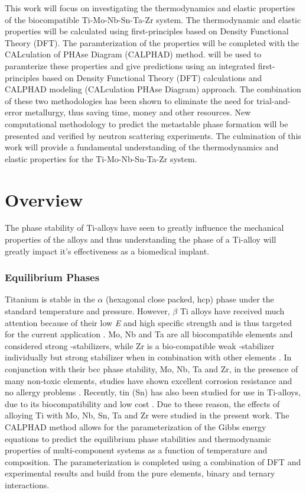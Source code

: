 This work will focus on investigating the thermodynamics and elastic properties of the biocompatible Ti-Mo-Nb-Sn-Ta-Zr system. The thermodynamic and elastic properties will be calculated using first-principles based on Density Functional Theory (DFT). The paramterization of the properties will be completed with the CALculation of PHAse Diagram (CALPHAD) method.  will be used to paramterize these properties and give predictions  using an integrated first-principles based on Density Functional Theory (DFT) calculations and CALPHAD modeling (CALculation PHAse Diagram) approach. The combination of these two methodologies has been shown to eliminate the need for trial-and-error metallurgy, thus saving time, money and other resources. New computational methodology to predict the metastable phase formation will be presented and verified by neutron scattering experiments. The culmination of this work will provide a fundamental understanding of the thermodynamics and elastic properties for the Ti-Mo-Nb-Sn-Ta-Zr system. 


\section{Overview}

The phase stability of Ti-alloys have seen to greatly influence the mechanical properties of the alloys and thus understanding the phase of a Ti-alloy will greatly impact it’s effectiveness as a biomedical implant.


\subsubsection{Equilibrium Phases}

Titanium is stable in the $\alpha$ (hexagonal close packed, hcp) phase under the standard temperature and pressure. However, $\beta$ Ti alloys have received much attention because of their low \textit{E} and high specific strength and is thus targeted for the current application \cite{Mei2011,Brailovski2011b}. Mo, Nb and Ta are all biocompatible elements and considered strong -stabilizers, while Zr is a bio-compatible weak -stabilizer individually but strong stabilizer when in combination with other elements \cite{Long1998a}.  In conjunction with their bcc phase stability, Mo, Nb, Ta and Zr, in the presence of many non-toxic elements, studies have shown excellent corrosion resistance and no allergy problems \cite{Tane2008a}. Recently, tin (Sn) has also been studied for use in Ti-alloys,  due to its biocompatibility and low cost \cite{Niinomi2012}. Due to these reason, the effects of alloying Ti with Mo, Nb, Sn, Ta and Zr were studied in the present work. The CALPHAD method allows for the parameterization of the Gibbs energy equations to predict the equilibrium phase stabilities and thermodynamic properties of multi-component systems as a function of temperature and composition. The parameterization is completed using a combination of DFT and experimental results and build from the pure elements, binary and ternary interactions. 

